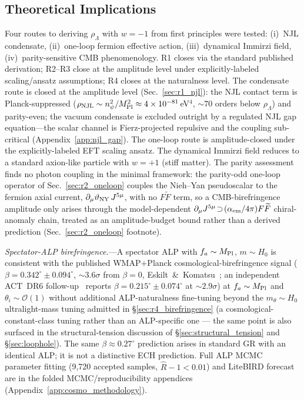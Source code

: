 \documentclass[aps,prd,twocolumn,superscriptaddress,showpacs,preprintnumbers,nofootinbib,longbibliography,floatfix]{revtex4-2}
\newcommand{\MPl}{M_{\rm Pl}}
\begin{document}
\subsection{Theoretical Implications}

Four routes to deriving $\rho_\Lambda$ with $w=-1$ from first principles were
tested: (i)~NJL condensate, (ii)~one-loop fermion effective action, (iii)~dynamical
Immirzi field, (iv)~parity-sensitive CMB phenomenology. R1 closes via the
standard published derivation; R2--R3 close at the amplitude level under
explicitly-labeled scaling/ansatz assumptions; R4 closes at the naturalness
level. The condensate route is closed at the amplitude level
(Sec.~\ref{sec:r1_njl}): the NJL contact term is Planck-suppressed
($\rho_{\rm NJL}\sim n_\psi^2/\MPl^2 \approx 4\times10^{-81}\,$eV$^4$, ${\sim}70$
orders below $\rho_\Lambda$) and parity-even; the vacuum condensate is
excluded outright by a regulated NJL gap equation---the scalar channel is
Fierz-projected repulsive and the coupling sub-critical
(Appendix~\ref{app:njl_gap}). The one-loop route is
amplitude-closed under the explicitly-labeled EFT scaling ansatz. The dynamical Immirzi field reduces to a standard
axion-like particle with $w=+1$ (stiff matter). The parity assessment finds no
photon coupling in the minimal framework: the parity-odd one-loop operator
of Sec.~\ref{sec:r2_oneloop} couples the Nieh--Yan pseudoscalar to the
fermion axial current, $\partial_\mu\vartheta_{\rm NY}\,J^{5\mu}$, with no
$F\widetilde F$ term, so a CMB-birefringence amplitude only arises through
the model-dependent $\partial_\mu J^{5\mu}\!\supset\!(\alpha_{\rm em}/4\pi)
F\widetilde F$ chiral-anomaly chain, treated as an amplitude-budget bound
rather than a derived prediction (Sec.~\ref{sec:r2_oneloop} footnote).

\textit{Spectator-ALP birefringence.}---A spectator ALP with $f_a\sim\MPl$,
$m\sim H_0$ is consistent with the published WMAP$+$Planck
cosmological-birefringence signal ($\beta=0.342^\circ\pm 0.094^\circ$,
$\sim\!3.6\sigma$ from $\beta=0$, Eskilt~\&~Komatsu~\cite{Eskilt2022}; an
independent ACT~DR6 follow-up~\cite{DiegoPalazuelos2025} reports
$\beta=0.215^\circ\pm 0.074^\circ$ at $\sim\!2.9\sigma$) at $f_a\sim\MPl$
and $\theta_i\sim\mathcal{O}(1)$ without additional ALP-naturalness
fine-tuning beyond the $m_\theta\sim H_0$ ultralight-mass tuning admitted
in \S\ref{sec:r4_birefringence} (a cosmological-constant-class tuning rather
than an ALP-specific one --- the same point is also surfaced in the structural-tension
discussion of \S\ref{sec:structural_tension} and \S\ref{sec:loophole}).
The same $\beta\approx 0.27^\circ$ prediction arises in
standard GR with an identical ALP; it is not a distinctive ECH prediction.
Full ALP MCMC parameter fitting (9,720 accepted samples, $\hat{R}-1<0.01$) and
LiteBIRD forecast are in the folded MCMC/reproducibility appendices (Appendix~\ref{app:cosmo_methodology}).
\end{document}
